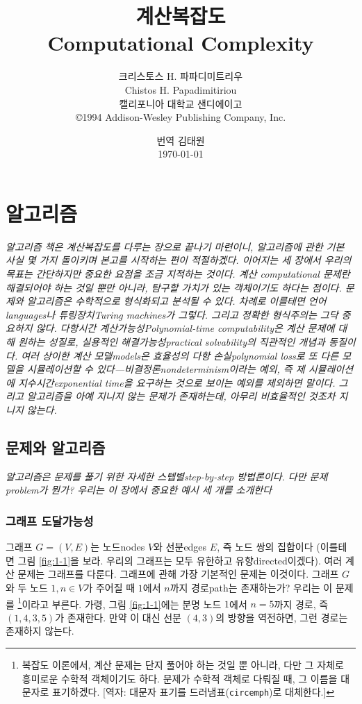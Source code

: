 \documentclass[a4paper,chapter,atbegshi,itemph]{oblivoir}
\title{계산복잡도\\Computational Complexity}
\author{크리스토스 H. 파파디미트리우\\
Chistos H. Papadimitiriou\\
\small 캘리포니아 대학교 샌디에이고\\
\small \copyright 1994 Addison-Wesley Publishing Company, Inc.}
\date{번역 김태원\\\today}
\begin{document}
\begin{titlingpage}
  \maketitle
\end{titlingpage}
\frontmatter
\tableofcontents
\mainmatter
\renewcommand{\partpageend}{}
\part{알고리즘}
\vspace{5\baselineskip}\noindent
\emph{알고리즘 책은 계산복잡도를 다루는 장으로 끝나기 마련이니, 알고리즘에 관한
기본 사실 몇 가지 돌이키며 본고를 시작하는 편이 적절하겠다. 이어지는 세 장에서
우리의 목표는 간단하지만 중요한 요점을 조금 지적하는 것이다. 계산{\footnotesize
computational} 문제란 해결되어야 하는 것일 뿐만 아니라, 탐구할 가치가 있는
객체이기도 하다는 점이다. 문제와 알고리즘은 수학적으로 형식화되고 분석될 수 있다.
차례로 이를테면 언어{\footnotesize languages}나 튜링장치{\footnotesize Turing
machines}가 그렇다. 그리고 정확한 형식주의는 그닥 중요하지 않다. 다항시간
계산가능성{\footnotesize Polynomial-time computability}은 계산 문제에 대해 원하는
성질로, 실용적인 해결가능성{\footnotesize practical solvability}의 직관적인
개념과 동질이다. 여러 상이한 계산 모델{\footnotesize models}은 효율성의 다항
손실{\footnotesize polynomial loss}로 또 다른 모델을 시뮬레이션할 수 
있다---비결정론{\footnotesize nondeterminism}이라는 예외, 즉 제 시뮬레이션에 
지수시간{\footnotesize exponential time}을 요구하는 것으로 보이는 예외를 제외하면
말이다. 그리고 알고리즘을 아예 지니지 않는 문제가 존재하는데, 아무리 비효율적인
것조차 지니지 않는다.
}
\cleardoublepage
\chapter{문제와 알고리즘}
\emph{알고리즘은 문제를 풀기 위한 자세한 스텝별{\footnotesize step-by-step}
방법론이다. 다만 문제{\footnotesize problem}가 뭔가? 우리는 이 장에서 
중요한 예시 세 개를 소개한다}
\section{그래프 도달가능성}
그래프 $G=(V,E)$는 노드{\footnotesize nodes} $V$와 선분{\footnotesize edges}
$E$, 즉 노드 쌍의 집합이다 (이를테면 그림 \ref{fig:1-1}을 보라. 우리의 그래프는
모두 유한하고 유향{\footnotesize directed}이겠다). 여러 계산 문제는 그래프를
다룬다. 그래프에 관해 가장 기본적인 문제는 이것이다. 그래프 $G$와 두 노드
$1,n\in V$가 주어질 때 $1$에서 $n$까지 경로{\footnotesize path}는 존재하는가?
우리는 이 문제를 \footnote[2]{복잡도 이론에서, 계산 문제는 단지 풀어야 하는 것일 뿐
아니라, 다만 그 자체로 흥미로운 수학적 객체이기도 하다. 문제가 수학적 객체로
다뤄질 때, 그 이름을 대문자로 표기하겠다. [역자: 대문자 표기를 
드러냄표(\texttt{circemph})로 대체한다.]}이라고 부른다. 가령, 그림 
\ref{fig:1-1}에는 분명 노드 $1$에서 $n=5$까지 경로, 즉 $(1,4,3,5)$가 존재한다. 
만약 이 대신 선분 $(4,3)$의 방향을 역전하면, 그런 경로는 존재하지 않는다. 
\end{document}
